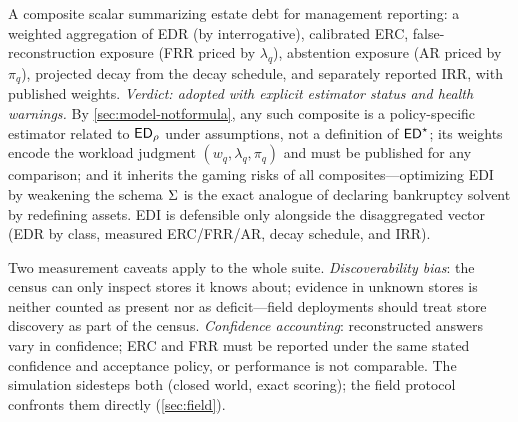 \begin{metricdef}
\label{met:edi}
A composite scalar summarizing estate debt for management reporting: a weighted
aggregation of EDR (by interrogative), calibrated ERC, false-reconstruction
exposure (FRR priced by $\lambda_q$), abstention exposure (AR priced by $\pi_q$),
projected decay from the decay schedule, and separately reported IRR, with published
weights. \emph{Verdict: adopted with explicit estimator
status and health warnings.} By \cref{sec:model-notformula}, any such composite is
a policy-specific estimator related to $\mathsf{ED}_\rho$ under assumptions, not a
definition of $\mathsf{ED}^{\star}$;
its weights encode the workload judgment $(w_q, \lambda_q, \pi_q)$ and must be published for
any comparison; and it inherits the gaming risks of all composites---optimizing EDI
by weakening the schema $\Sigma$ is the exact analogue of declaring bankruptcy
solvent by redefining assets. EDI is defensible only alongside the disaggregated
vector (EDR by class, measured ERC/FRR/AR, decay schedule, and IRR).
\end{metricdef}

Two measurement caveats apply to the whole suite. \emph{Discoverability bias}: the
census can only inspect stores it knows about; evidence in unknown stores is
neither counted as present nor as deficit---field deployments should treat store
discovery as part of the census. \emph{Confidence accounting}: reconstructed
answers vary in confidence; ERC and FRR must be reported under the same stated
confidence and acceptance policy, or performance is not comparable. The simulation sidesteps both (closed
world, exact scoring); the field protocol confronts them directly
(\cref{sec:field}).
